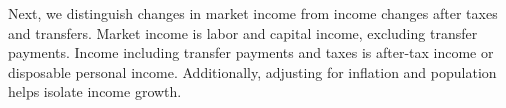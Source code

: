 \begin{minipage}{0.76\textwidth}   
\small Next, we distinguish changes in market income from income changes after taxes and transfers. Market income is labor and capital income, excluding transfer payments. Income including transfer payments and taxes is after-tax income or disposable personal income. Additionally, adjusting for inflation and population helps isolate income growth.


\vspace{1mm}

\vspace{-1mm}
\end{minipage}

